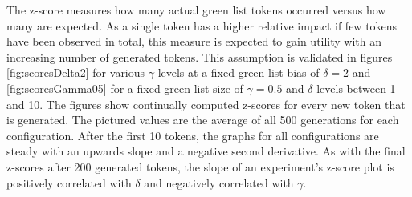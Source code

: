     The z-score measures how many actual green list tokens occurred versus how many are expected.
    As a single token has a higher relative impact if few tokens have been observed in total, this measure is expected to gain utility with an increasing number of generated tokens.
    This assumption is validated in figures \ref{fig:scoresDelta2} for various $\gamma$ levels at a fixed green list bias of $\delta = 2$ and \ref{fig:scoresGamma05} for a fixed green list size of $\gamma = 0.5$ and $\delta$ levels between 1 and 10.
    The figures show continually computed z-scores for every new token that is generated.
    The pictured values are the average of all 500 generations for each configuration.
    After the first 10 tokens, the graphs for all configurations are steady with an upwards slope and a negative second derivative.
    As with the final z-scores after 200 generated tokens, the slope of an experiment's z-score plot is positively correlated with $\delta$ and negatively correlated with $\gamma$.

